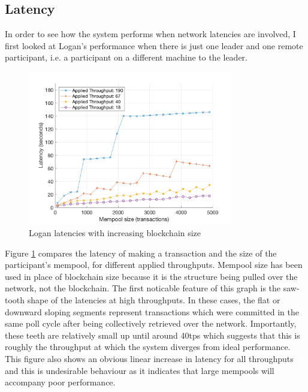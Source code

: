 \documentclass[12pt,a4paper,twoside,openright]{report}
\begin{document}
	\subsection{Latency}
	In order to see how the system performs when network latencies are involved, I first looked at Logan's performance when there is just one leader and one remote participant, i.e. a participant on a different machine to the leader.
	\begin{figure}
		\centering
		\includegraphics[width=0.8\textwidth]{figs/latencies_sizes_throughputs.png}
		\caption{Logan latencies with increasing blockchain size}
		\label{figs:remlatencysize}
	\end{figure} 
	Figure \ref{figs:remlatencysize} compares the latency of making a transaction and the size of the participant's mempool, for different applied throughputs.
	Mempool size has been used in place of blockchain size because it is the structure being pulled over the network, not the blockchain.
	The first noticable feature of this graph is the saw-tooth shape of the latencies at high throughputs.
	In these cases, the flat or downward sloping segments represent transactions which were committed in the same poll cycle after being collectively retrieved over the network.
	Importantly, these teeth are relatively small up until around 40tps which suggests that this is roughly the throughput at which the system diverges from ideal performance.
	This figure also shows an obvious linear increase in latency for all throughputs and this is undesirable behaviour as it indicates that large mempools will accompany poor performance. \\
	
\end{document}

